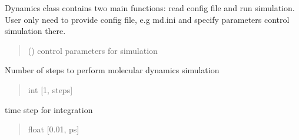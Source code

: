 \documentclass[letterpaper,10pt,english]{sphinxmanual}
\begin{document}
\begin{fulllineitems}
\label{\detokenize{modules/dynamics:hps.dynamics.Dynamics}}
\pysigstartsignatures
{}
\pysigstopsignatures
\sphinxAtStartPar
Dynamics class contains two main functions: read config file and run simulation.
User only need to provide config file, e.g md.ini and specify parameters control simulation there.
\begin{quote}\begin{description}
\sphinxAtStartPar
{} () \textendash{} control parameters for simulation

\end{description}\end{quote}

\begin{fulllineitems}
\label{\detokenize{modules/dynamics:hps.dynamics.Dynamics.md_steps}}
\pysigstartsignatures
{}
\pysigstopsignatures
\sphinxAtStartPar
Number of steps to perform molecular dynamics simulation
\begin{quote}\begin{description}
\sphinxAtStartPar
int {[}1, steps{]}

\end{description}\end{quote}

\end{fulllineitems}


\begin{fulllineitems}
\label{\detokenize{modules/dynamics:hps.dynamics.Dynamics.dt}}
\pysigstartsignatures
{}
\pysigstopsignatures
\sphinxAtStartPar
time step for integration
\begin{quote}\begin{description}
\sphinxAtStartPar
float {[}0.01, ps{]}

\end{description}\end{quote}


\end{fulllineitems}
\end{fulllineitems}
\end{document}
